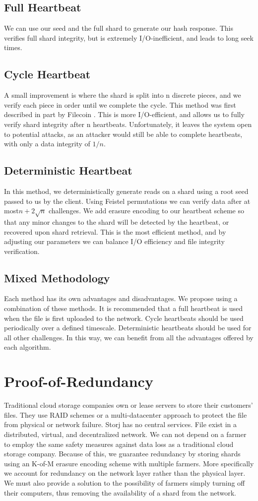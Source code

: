 \documentclass[a4paper,10pt]{article}
\begin{document}
\subsection{Full Heartbeat}
We can use our seed and the full shard to generate our hash response. This verifies full shard integrity, but is extremely I/O-inefficient, and leads to long seek times.
\subsection{Cycle Heartbeat}
A small improvement is where the shard is split into n discrete pieces, and we verify each piece in order until we complete the cycle. This method was first described in part by Filecoin \cite{11}. This is more I/O-efficient, and allows us to fully verify shard integrity after n heartbeats. Unfortunately, it leaves the system open to potential attacks, as an attacker would still be able to complete heartbeats, with only a data integrity of $1/n$.
\subsection{Deterministic Heartbeat}
In this method, we deterministically generate reads on a shard using a root seed passed to us by the client. Using Feistel permutations we can verify data after at most$n+2 \sqrt{n}$ challenges. We add erasure encoding to our heartbeat scheme so that any minor changes to the shard will be detected by the heartbeat, or recovered upon shard retrieval. This is the most efficient method, and by adjusting our parameters we can balance I/O efficiency and file integrity verification.  
\subsection{Mixed Methodology}
Each method has its own advantages and disadvantages. We propose using a combination of these methods. It is recommended that a full heartbeat is used when the file is first uploaded to the network. Cycle heartbeats should be used periodically over a defined timescale. Deterministic heartbeats should be used for all other challenges. In this way, we can benefit from all the advantages offered by each algorithm. 

\section{Proof-of-Redundancy}
Traditional cloud storage companies own or lease servers to store their customers’ files. They use RAID schemes or a multi-datacenter approach to protect the file from physical or network failure. Storj has no central services. File exist in a distributed, virtual, and decentralized network. We can not depend on a farmer to employ the same safety measures against data loss as a traditional cloud storage company. Because of this, we guarantee redundancy by storing shards using an K-of-M erasure encoding scheme with multiple farmers. More specifically we account for redundancy on the network layer rather than the physical layer. We must also provide a solution to the possibility of farmers simply turning off their computers, thus removing the availability of a shard from the network. \\
\end{document}
